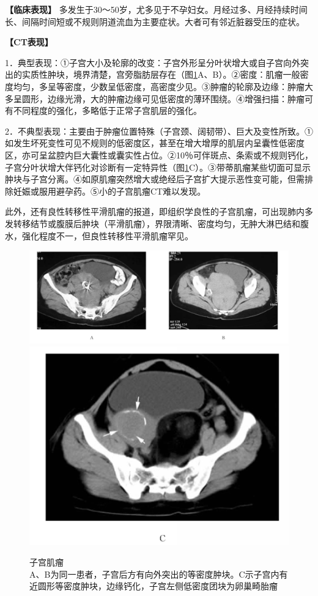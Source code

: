 \textbf{【临床表现】}
多发生于30～50岁，尤多见于不孕妇女。月经过多、月经持续时间长、间隔时间短或不规则阴道流血为主要症状。大者可有邻近脏器受压的症状。

\textbf{【CT表现】}

1．典型表现：①子宫大小及轮廓的改变：子宫外形呈分叶状增大或自子宫向外突出的实质性肿块，境界清楚，宫旁脂肪层存在（图\ref{fig21-9}A、B）。②密度：肌瘤一般密度均匀，多呈等密度，少数呈低密度，高密度少见。③肿瘤的轮廓及边缘：肿瘤大多呈圆形，边缘光滑，大的肿瘤边缘可见低密度的薄环围绕。④增强扫描：肿瘤可有不同程度的强化，多略低于正常子宫肌层的强化。

2．不典型表现：主要由于肿瘤位置特殊（子宫颈、阔韧带）、巨大及变性所致。①如发生坏死变性可见不规则的低密度区，甚至在增大增厚的肌层内呈囊性低密度区，亦可呈盆腔内巨大囊性或囊实性占位。②10％可伴斑点、条索或不规则钙化，子宫分叶状增大伴钙化对诊断有一定特异性（图\ref{fig21-9}C）。③带蒂肌瘤某些切面可显示肿块与子宫分离。④如原肌瘤突然增大或绝经后子宫扩大提示恶性变可能，但需排除妊娠或服用避孕药。⑤小的子宫肌瘤CT难以发现。

此外，还有良性转移性平滑肌瘤的报道，即组织学良性的子宫肌瘤，可出现肺内多发转移结节或腹膜后肿块（平滑肌瘤），界限清晰、密度均匀，无肿大淋巴结和腹水，强化程度不一，但良性转移性平滑肌瘤罕见。

\begin{figure}[!htbp]
 \centering
 \includegraphics[width=.7\textwidth,height=\textheight,keepaspectratio]{./images/Image00405.jpg}
 \includegraphics[width=.7\textwidth,height=\textheight,keepaspectratio]{./images/Image00406.jpg}
 \captionsetup{justification=centering}
 \caption{子宫肌瘤\\{\small A、B为同一患者，子宫后方有向外突出的等密度肿块。C示子宫内有近圆形等密度肿块，边缘钙化，子宫左侧低密度团块为卵巢畸胎瘤}}
 \label{fig21-9}
  \end{figure} 


